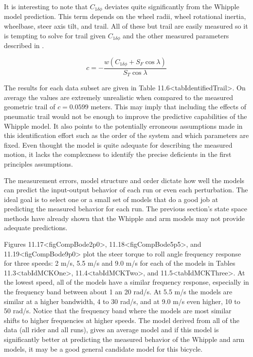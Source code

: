 \documentclass[a4paper]{article}
\begin{document}
It is interesting to note that $C_{1 \delta \phi}$ deviates quite
significantly from the Whipple model prediction. This term depends on
the wheel radii, wheel rotational inertia, wheelbase, steer axis tilt,
and trail. All of these but trail are easily measured so it is tempting
to solve for trail given $C_{1 \delta \phi}$ and the other measured
parameters described in \cite{Meijaard2007}.

\[c = -\frac{w(C_{1 \delta \phi} + S_F \operatorname{cos}\lambda)}{S_T
\operatorname{cos}\lambda}\]

The results for each data subset are given in Table
11.6\textless{}tabIdentifiedTrail\textgreater{}. On average the values
are extremely unrealistic when compared to the measured geometric trail
of $c=0.0599$ meters. This may imply that including the effects of
pneumatic trail would not be enough to improve the predictive
capabilities of the Whipple model. It also points to the potentially
erroneous assumptions made in this identification effort such as the
order of the system and which parameters are fixed. Even thought the
model is quite adequate for describing the measured motion, it lacks the
complexness to identify the precise deficients in the first principles
assumptions.

The measurement errors, model structure and order dictate how well the
models can predict the input-output behavior of each run or even each
perturbation. The ideal goal is to select one or a small set of models
that do a good job at predicting the measured behavior for each run. The
previous section's state space methods have already shown that the
Whipple and arm models may not provide adequate predictions.

Figures 11.17\textless{}figCompBode2p0\textgreater{},
11.18\textless{}figCompBode5p5\textgreater{}, and
11.19\textless{}figCompBode9p0\textgreater{} plot the steer torque to
roll angle frequency response for three speeds: 2 m/s, 5.5 m/s and 9.0
m/s for each of the models in Tables
11.3\textless{}tabIdMCKOne\textgreater{},
11.4\textless{}tabIdMCKTwo\textgreater{}, and
11.5\textless{}tabIdMCKThree\textgreater{}. At the lowest speed, all of
the models have a similar frequency response, especially in the
frequency band between about 1 an 20 rad/s. At 5.5 m/s the models are
similar at a higher bandwidth, 4 to 30 rad/s, and at 9.0 m/s even
higher, 10 to 50 rad/s. Notice that the frequency band where the models
are most similar shifts to higher frequencies at higher speeds. The
model derived from all of the data (all rider and all runs), gives an
average model and if this model is significantly better at predicting
the measured behavior of the Whipple and arm models, it may be a good
general candidate model for this bicycle.
\end{document}
